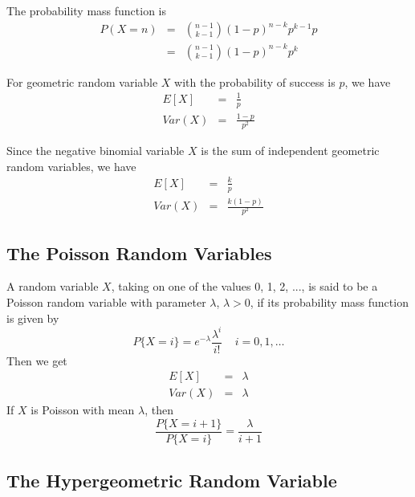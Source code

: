 \documentclass[12pt]{article}
\begin{document}
The probability mass function is
\begin{eqnarray*}
  P(X = n) 
  &=& \binom {n-1}{k-1} (1-p)^{n-k} p^{k-1} p \\
  &=& \binom {n-1}{k-1} (1-p)^{n-k} p^{k}
\end{eqnarray*}

For geometric random variable $X$ with the probability of success is $p$, we have
\begin{eqnarray*}
  E[X] &=& \frac {1}{p} \\
  Var(X) &=& \frac {1-p}{p^2}
\end{eqnarray*}

Since the negative binomial variable $X$ is the sum of independent geometric random variables, we have
\begin{eqnarray*}
  E[X] &=& \frac{k}{p} \\
  Var(X) &=& \frac{k(1-p)}{p^2}
\end{eqnarray*}

\subsection{The Poisson Random Variables}

A random variable $X$, taking on one of the values 0, 1, 2, ..., is said to be a Poisson random variable with parameter $\lambda$, $\lambda>0$, if its probability mass function is given by
\begin{equation*}
  P\{ X=i \} = e^{-\lambda} \frac{\lambda^i}{i!} \;\;\;\; i = 0,1,\dots
\end{equation*}
Then we get
\begin{eqnarray*}
  E[X] &=& \lambda \\
  Var(X) &=& \lambda
\end{eqnarray*}
If $X$ is Poisson with mean $\lambda$, then
\begin{equation*}
  \frac {P\{X=i+1\}}{P\{X=i\}}
  = \frac {\lambda}{i+1}
\end{equation*}

\subsection{The Hypergeometric Random Variable}
\end{document}

